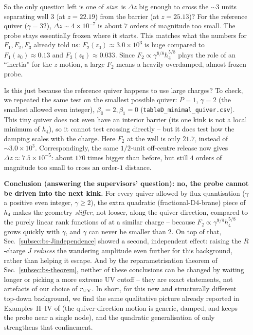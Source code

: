 \documentclass[11pt]{article}
\begin{document}
So the only question left is one of \emph{size}: is $\Delta z$ big enough to cross the $\sim3$ units separating well 3 (at $z=22.19$) from the barrier (at $z=25.13$)? For the reference quiver ($\gamma=32$), $\Delta z\sim4\times10^{-7}$ is about $7$ orders of magnitude too small. The probe stays essentially frozen where it starts. This matches what the numbers for $F_1,F_2,F_3$ already told us: $F_2(z_0)\approx3.0\times10^3$ is huge compared to $F_1(z_0)\approx0.13$ and $F_3(z_0)\approx0.033$. Since $F_2\propto\gamma^{9/8}h_4^{5/8}$ plays the role of an ``inertia'' for the $z$-motion, a large $F_2$ means a heavily overdamped, almost frozen probe.

Is this just because the reference quiver happens to use large charges? To check, we repeated the same test on the smallest possible quiver: $P=1$, $\gamma=2$ (the smallest allowed even integer), $\beta_0=2,\beta_1=0$ (\texttt{tableD\_minimal\_quiver.csv}). This tiny quiver does not even have an interior barrier (its one kink is not a local minimum of $h_4$), so it cannot test crossing directly -- but it does test how the damping scales with the charge. Here $F_2$ at the well is only $21.7$, instead of $\sim3.0\times10^3$. Correspondingly, the same $1/2$-unit off-centre release now gives $\Delta z\approx7.5\times10^{-5}$: about $170$ times bigger than before, but still $4$ orders of magnitude too small to cross an order-$1$ distance.

\textbf{Conclusion (answering the supervisors' question): no, the probe cannot be driven into the next kink.} For every quiver allowed by flux quantisation ($\gamma$ a positive even integer, $\gamma\ge2$), the extra quadratic (fractional-D4-brane) piece of $h_4$ makes the geometry \emph{stiffer}, not looser, along the quiver direction, compared to the purely linear rank functions of \cite{Fatemiabhari:2025qcg} at a similar charge -- because $F_2\propto\gamma^{9/8}h_4^{5/8}$ grows quickly with $\gamma$, and $\gamma$ can never be smaller than $2$. On top of that, Sec.~\ref{subsec:bs-Jindependence} showed a second, independent effect: raising the $R$-charge $J$ \emph{reduces} the wandering amplitude even further for this background, rather than helping it escape. And by the reparametrisation theorem of Sec.~\ref{subsec:bs-theorem}, neither of these conclusions can be changed by waiting longer or picking a more extreme UV cutoff -- they are exact statements, not artefacts of our choice of $r_{\rm UV}$. In short, for this new and structurally different top-down background, we find the same qualitative picture already reported in Examples~II--IV of \cite{Fatemiabhari:2025qcg} (the quiver-direction motion is generic, damped, and keeps the probe near a single node), and the quadratic generalisation of \cite{Couzens:2021tnq} only strengthens that confinement.

\appendix


\end{document}
